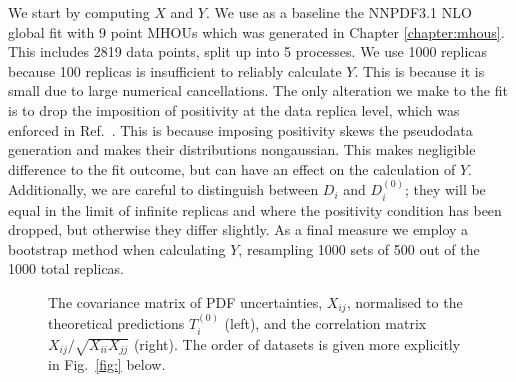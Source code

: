 We start by computing $X$ and $Y$. We use as a baseline the NNPDF3.1 NLO global fit with 9 point MHOUs which was generated in Chapter \ref{chapter:mhous}. This includes 2819 data points, split up into 5 processes. We use 1000 replicas because 100 replicas is insufficient to reliably calculate $Y$. This is because it is small due to large numerical cancellations. The only alteration we make to the fit is to drop the imposition of positivity at the data replica level, which was enforced in Ref.~\cite{Ball:2017nwa}. This is because imposing positivity skews the pseudodata generation and makes their distributions nongaussian. This makes negligible difference to the fit outcome, but can have an effect on the calculation of $Y$. Additionally, we are careful to distinguish between $D_i$ and $D_i^{(0)}$; they will be equal in the limit of infinite replicas and where the positivity condition has been dropped, but otherwise they differ slightly. As a final measure we employ a bootstrap method when calculating $Y$, resampling 1000 sets of 500 out of the 1000 total replicas.
\begin{figure}[h]
    \begin{center}
    \end{center}
  \vspace{-0.55cm}
  \caption{The covariance matrix of PDF uncertainties, $X_{ij}$, normalised to the theoretical predictions $T^{(0)}_i$  (left), and the correlation matrix $X_{ij}/\sqrt{X_{ii}X_{jj}}$ (right). The order of datasets is given more explicitly in Fig.~\ref{fig:} below.}
  \label{fig:X}
\end{figure}


